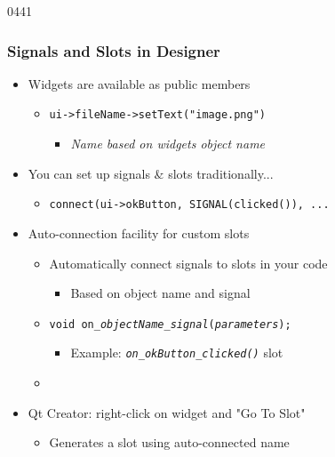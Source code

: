 \begin{slide}{0441}\frametitle{Signals and Slots in Designer}
  \begin{itemize}
  \item Widgets are available as public members
    \begin{itemize}
    \item \texttt{ui->fileName->setText("image.png")}
      \begin{itemize}
      \item \textit{Name based on widgets object name}
      \end{itemize}
    \end{itemize}
  \item You can set up signals \& slots traditionally...
    \begin{itemize}
    \item \texttt{connect(ui->okButton, SIGNAL(clicked()), ...}
    \end{itemize}
  \end{itemize}
  \begin{itemize}
  \item Auto-connection facility for custom slots
    \begin{itemize}
    \item Automatically connect signals to slots in your code
      \begin{itemize}
      \item Based on object name and signal 
      \end{itemize}
    \item \texttt{void on\_\emph{objectName}\_\emph{signal}(\emph{parameters});}
      \begin{itemize}
      \item Example: \textit{\texttt{on\_okButton\_clicked()}} slot
      \end{itemize}
    \item {}
    \end{itemize}
  \end{itemize}
  \begin{itemize}
  \item Qt Creator: right-click on widget and "Go To Slot"
    \begin{itemize}
    \item Generates a slot using auto-connected name
    \end{itemize}
  \end{itemize}

\end{slide}



